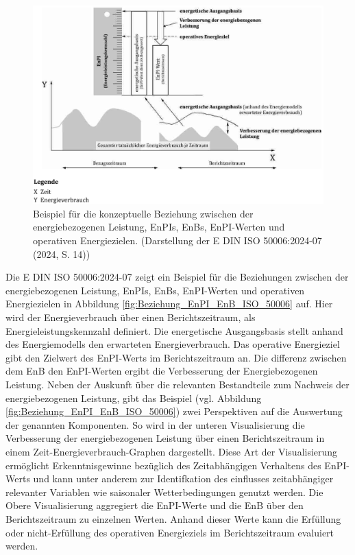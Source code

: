 \begin{figure}[H]
    \centering
    \includegraphics[width=1\textwidth]{../../Ressourcen/Abbildungen/ISO_50006_Beispiel_EnPI_EnB.jpg}
    \caption{Beispiel für die konzeptuelle Beziehung zwischen der energiebezogenen Leistung, EnPIs, EnBs, EnPI-Werten und operativen Energiezielen. (Darstellung der E DIN ISO 50006:2024-07 (2024, S. 14))}
    \label{fig:Beziehung_EnPI_EnB_ISO_50006}
\end{figure}

Die E DIN ISO 50006:2024-07 zeigt ein Beispiel für die Beziehungen zwischen der energiebezogenen Leistung, EnPIs, EnBs, EnPI-Werten und operativen Energiezielen 
in Abbildung \eqref{fig:Beziehung_EnPI_EnB_ISO_50006} auf.
Hier wird der Energieverbrauch über einen Berichtszeitraum, als Energieleistungskennzahl definiert.
Die energetische Ausgangsbasis stellt anhand des Energiemodells den erwarteten Energieverbrauch.
Das operative Energieziel gibt den Zielwert des EnPI-Werts im Berichtszeitraum an. 
Die differenz zwischen dem EnB den EnPI-Werten ergibt die Verbesserung der Energiebezogenen Leistung.
Neben der Auskunft über die relevanten Bestandteile zum Nachweis der energiebezogenen Leistung, gibt das Beispiel (vgl. Abbildung \eqref{fig:Beziehung_EnPI_EnB_ISO_50006}) 
zwei Perspektiven auf die Auswertung der genannten Komponenten.
So wird in der unteren Visualisierung die Verbesserung der energiebezogenen Leistung über einen Berichtszeitraum in einem Zeit-Energieverbrauch-Graphen dargestellt.
Diese Art der Visualisierung ermöglicht Erkenntnisgewinne bezüglich des Zeitabhängigen Verhaltens des EnPI-Werts und kann unter anderem zur Identifkation des 
einflusses zeitabhängiger relevanter Variablen wie saisonaler Wetterbedingungen genutzt werden. 
Die Obere Visualisierung aggregiert die EnPI-Werte und die EnB über den Berichtszeitraum zu einzelnen Werten. 
Anhand dieser Werte kann die Erfüllung oder nicht-Erfüllung des operativen Energieziels im Berichtszeitraum evaluiert werden.

